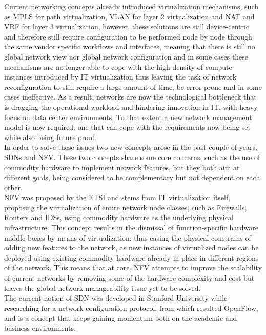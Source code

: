 %
Current networking concepts already introduced virtualization mechanisms, such as \gls{MPLS} for path virtualization, \gls{VLAN} for layer 2 virtualization and \gls{NAT} and \gls{VRF} for layer 3 virtualization\cite{Kreutz2014}, however, these solutions are still device-centric and therefore still require configuration to be performed node by node through the same vendor specific workflows and interfaces, meaning that there is still no global network view nor global network configuration\cite{Kreutz2014} and in some cases these mechanisms are no longer able to cope with the high density of compute instances introduced by \gls{IT} virtualization \cite{Duffy2012} thus leaving the task of network reconfiguration to still require a large amount of time, be error prone and in some cases ineffective.
As a result, networks are now the technological bottleneck that is dragging the operational workload and hindering innovation in \gls{IT}, with heavy focus on data center environments.
To that extent a new network management model is now required, one that can cope with the requirements now being set while also being future proof.\\
%
In order to solve these issues two new concepts arose in the past couple of years, \glspl{SDN} and \gls{NFV}.
These two concepts share some core concerns, such as the use of commodity hardware to implement network features, but they both aim at different goals, being considered to be complementary but not dependent on each other\cite{ETSI2014,Pate2013}.\\
%
\gls{NFV} was proposed by the \gls{ETSI} and stems from \gls{IT} virtualization itself, proposing the virtualization of entire network node classes, such as Firewalls, Routers and \glspl{IDS}, using commodity hardware as the underlying physical infrastructure.
This concept results in the dismissal of function-specific hardware middle boxes by means of virtualization, thus easing the physical constrains of adding new features to the network, as new instances of virtualized nodes can be deployed using existing commodity hardware already in place in different regions of the network\cite{ETSI2014}.
This means that at core, \gls{NFV} attempts to improve the scalability of current networks by removing some of the hardware complexity and cost but leaves the global network manageability issue yet to be solved.\\
%
The current notion of \gls{SDN} was developed in Stanford University while researching for a network configuration protocol, from which resulted OpenFlow, and is a concept that keeps gaining momentum both on the academic and business environments.
